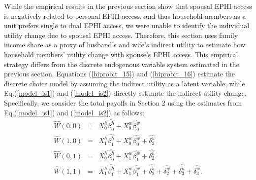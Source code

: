 \documentclass[legno,11pt]{article}
\begin{document}
While the empirical results in the previous section show that
spousal EPHI access is negatively related to personal EPHI access,
and thus household members as a unit prefers
 single to dual EPHI access, we were unable to identify
 the individual utility change due to spousal EPHI
 access. Therefore, this section uses family income share as
  a proxy of husband's and wife's indirect utility to
  estimate how household members' utility change with
  spouse's EPHI access. This empirical strategy differs
   from the discrete endogenous variable system
  estimated in the previous section. Equations (\ref{biprobit_15}) and (\ref{biprobit_16})
  estimate the discrete choice model by assuming the
  indirect utility as a latent variable, while Eq.(\ref{model_is1})
  and (\ref{model_is2}) directly estimate the indirect
  utility change. Specifically, we consider the total payoffs in Section 2 using the estimates from Eq.(\ref{model_is1}) and (\ref{model_is2}) as follows:
\begin{eqnarray}
\widehat{W}(0,0)& = &X^{h}_{0}\widehat{\beta^{h}_{0}}+X^{w}_{0}\widehat{\beta^{w}_{0}}  \\
\widehat{W}(1,0)& = &X^{h}_{1}\widehat{\beta^{h}_{1}}+X^{w}_{0}\widehat{\beta^{w}_{0}}+\widehat{\delta^{w}_{2}} \\
\widehat{W}(0,1)&  = &X^{h}_{0}\widehat{\beta^{h}_{0}}+X^{w}_{1}\widehat{\beta^{w}_{1}}+\widehat{\delta^{h}_{2}} \\
\widehat{W}(1,1)&  = &X^{h}_{1}\widehat{\beta^{h}_{1}}+X^{w}_{1}\widehat{\beta^{w}_{1}}+\widehat{\delta^{h}_{2}}+\widehat{\delta^{w}_{2}}+\widehat{\delta^{h}_{3}}+\widehat{\delta^{w}_{3}}.
\end{eqnarray}
\end{document}
